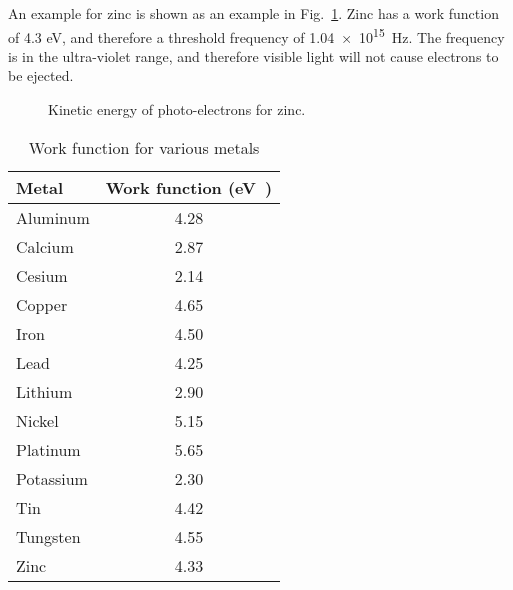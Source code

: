 An example for zinc is shown as an example in Fig.~\ref{fig:zinc}. Zinc has a
work function of 4.3 eV, and therefore a threshold frequency of
\SI{1.04e15}{\hertz}. The frequency is in the ultra-violet range, and therefore
visible light will not cause electrons to be ejected.
\begin{figure}[ht]
  \centering
  \caption{Kinetic energy of photo-electrons for zinc.}
  \label{fig:zinc}
\end{figure}

\begin{table}[ht]
  \centering
  \begin{tabular}{l|c}
    \rowcolor{pink}
    \textbf{Metal} & \textbf{Work function} (\si\electronvolt) \\ \hline
    Aluminum & 4.28 \\ \hline
    Calcium  & 2.87 \\ \hline
    Cesium   & 2.14 \\ \hline
    Copper   & 4.65 \\ \hline
    Iron     & 4.50 \\ \hline
    Lead     & 4.25 \\ \hline
    Lithium  & 2.90 \\ \hline
    Nickel   & 5.15 \\ \hline
    Platinum & 5.65 \\ \hline
    Potassium & 2.30 \\ \hline
    Tin      & 4.42 \\ \hline
    Tungsten & 4.55 \\ \hline
    Zinc     & 4.33 \\
  \end{tabular}
  \caption{Work function for various metals}
  \label{tabl:work-function}
\end{table}
%  
%
%
%
%

